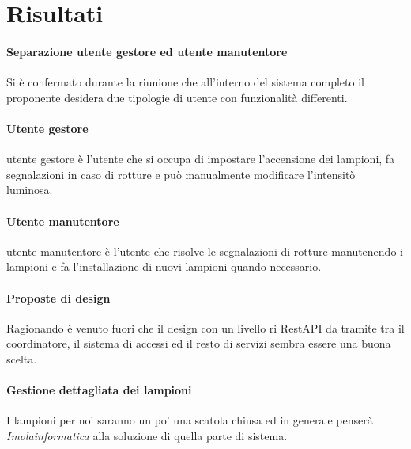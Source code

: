 \section{Risultati}

\paragraph{Separazione utente gestore ed utente manutentore}

Si è confermato durante la riunione che all'interno del sistema completo il proponente desidera due tipologie di utente con funzionalità differenti.

\paragraph{Utente gestore} utente gestore è l'utente che si occupa di impostare l'accensione dei lampioni, fa segnalazioni in caso di rotture e può manualmente modificare l'intensitò luminosa.

\paragraph{Utente manutentore} utente manutentore è l'utente che risolve le segnalazioni di rotture manutenendo i lampioni e fa l'installazione di nuovi lampioni quando necessario.

\paragraph{Proposte di design}

Ragionando è venuto fuori che il design con un livello ri RestAPI da tramite tra il coordinatore, il sistema di accessi ed il resto di servizi sembra essere una buona scelta.

\paragraph{Gestione dettagliata dei lampioni}

I lampioni per noi saranno un po' una scatola chiusa ed in generale penserà \textit{Imolainformatica} alla soluzione di quella parte di sistema.